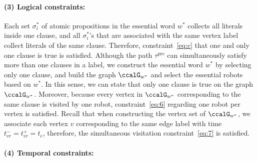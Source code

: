 \documentclass[Afour,sageh,times]{sagej}
\begin{document}
{{\paragraph{(3) Logical constraints:} Each set $\sigma^*_i$ of atomic propositions in the essential word $w^*$ collects all literals inside one clause, and all $\sigma^*_i$'s that are associated with the same vertex label collect literals of the same clause. Therefore, constraint~\eqref{eq:c} that one and only one clause is true is satisfied. Although the path $\tau^\text{pre}$ can simultaneously satisfy more than one clauses in a label, we construct the essential word $w^*$ by selecting only one clause, and build the graph $\ccalG_{w^*}$ and select the essential robots based on $w^*$. In this sense, we can state that only one clause is true on the graph $\ccalG_{w^*}$. Moreover, because every vertex in $\ccalG_{w^*}$ corresponding to the same clause is visited by one robot, constraint~\eqref{eq:6} regarding one robot per vertex is satisfied. Recall that when constructing the vertex set of $\ccalG_{w^*}$, we associate each vertex $v$ corresponding to the same edge label with time $t_{vr}^- = t_{vr}^+ = t_e$, therefore, the simultaneous visitation constraint~\eqref{eq:7} is satisfied.

\paragraph{(4) Temporal constraints:}
}}
\end{document}

